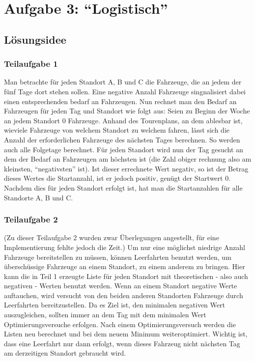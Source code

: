 \section{Aufgabe 3: ``Logistisch''}
\subsection{Lösungsidee}
\subsubsection{Teilaufgabe 1}
Man betrachte für jeden Standort A, B und C die Fahrzeuge, die an jedem der fünf Tage dort stehen sollen.
Eine negative Anzahl Fahrzeuge singnalisiert dabei einen entsprechenden bedarf an Fahrzeugen.
Nun rechnet man den Bedarf an Fahrzeugen für jeden Tag und Standort wie folgt aus:
Seien zu Beginn der Woche an jedem Standort 0 Fahrzeuge.
Anhand des Tourenplans, an dem ablesbar ist, wieviele Fahrzeuge von welchem Standort zu welchem fahren,
lässt sich die Anzahl der erforderlichen Fahrzeuge des nächsten Tages berechnen. So werden auch alle Folgetage berechnet.
Für jeden Standort wird nun der Tag gesucht an dem der Bedarf an Fahrzeugen am höchsten ist (die Zahl obiger rechnung also am kleinsten, ``negativsten'' ist).
Ist dieser errechnete Wert negativ, so ist der Betrag dieses Wertes die Startanzahl, ist er jedoch positiv, genügt der Startwert 0.
Nachdem dies für jeden Standort erfolgt ist, hat man die Startanzahlen für alle Standorte A, B und C.
\subsubsection{Teilaufgabe 2}
(Zu dieser Teilaufgabe 2 wurden zwar Überlegungen angestellt, für eine Implementierung fehlte jedoch die Zeit.)
Um nur eine möglichst niedrige Anzahl Fahrzeuge bereitstellen zu müssen, 
können Leerfahrten benutzt werden, um überschüssige Fahrzeuge an einem Standort, zu einem anderem zu bringen.
Hier kann die in Teil 1 erzeugte Liste für jeden Standort mit theoretischen - also auch negativen - Werten benutzt werden.
Wenn an einem Standort negative Werte auftauchen, wird versucht von den beiden anderen Standorten Fahrzeuge durch Leerfahrten bereitzustellen.
Da es Ziel ist, den minimalen negativen Wert auszugleichen, sollten immer an dem Tag mit dem minimalen Wert Optimierungsversuche erfolgen.
Nach einem Optimierungsversuch werden die Listen neu berechnet und bei dem neuem Minimum weiteroptimiert.
Wichtig ist, dass eine Leerfahrt nur dann erfolgt, wenn dieses Fahrzeug nicht nächsten Tag am derzeitigen Standort gebraucht wird.
